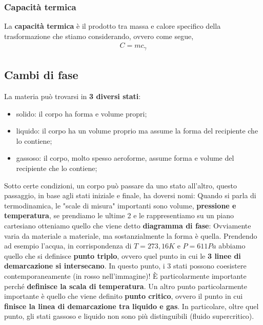         \subsubsection{Capacità termica}
            La \textbf{capacità termica} è il prodotto tra massa e calore specifico della trasformazione che stiamo considerando, ovvero come segue,
            \begin{align*}
                C=mc_{\gamma}
            \end{align*}



    \subsection{Cambi di fase}
        La materia può trovarsi in \textbf{3 diversi stati}:
        \begin{itemize}
            \item solido: il corpo ha forma e volume propri;
            \item liquido: il corpo ha un volume proprio ma assume la forma del recipiente che lo contiene;
            \item gassoso: il corpo, molto spesso aeroforme, assume forma e volume del recipiente che lo contiene;
        \end{itemize}
        Sotto certe condizioni, un corpo può passare da uno stato all'altro, questo passaggio, in base agli stati iniziale e finale, ha doversi nomi:
        Quando si parla di termodinamica, le "scale di misura" importanti sono volume, \textbf{pressione e temperatura}, se prendiamo le ultime 2 e le rappresentiamo su un piano cartesiano otteniamo quello che viene detto \textbf{diagramma di fase}:
        Ovviamente varia da materiale a materiale, ma sostanzialmente la forma è quella. Prendendo ad esempio l'acqua, in corrispondenza di $T = 273,16 K$ e $P = 611 Pa$ abbiamo quello che si definisce \textbf{punto triplo}, ovvero quel punto in cui le \textbf{3 linee di demarcazione si intersecano}. In questo punto, i 3 stati possono coesistere contemporaneamente (in rosso nell'immagine)! È particolarmente importante perché \textbf{definisce la scala di temperatura}. Un altro punto particolarmente importante è quello che viene definito \textbf{punto critico}, ovvero il punto in cui \textbf{finisce la linea di demarcazione tra liquido e gas}. In particolare, oltre quel punto, gli stati gassoso e liquido non sono più distinguibili (fluido supercritico).

